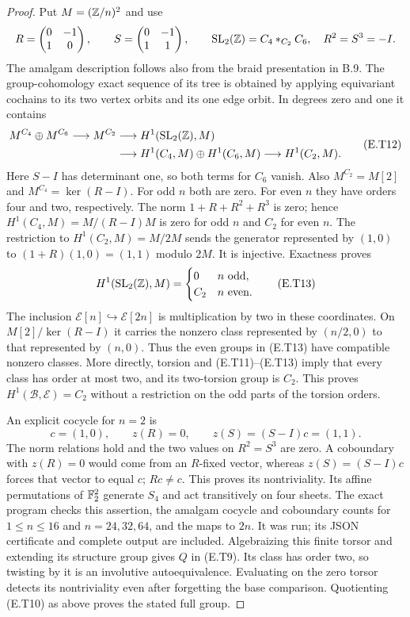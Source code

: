 \begin{proof}
Put $M=(\mathbb Z/n)^2$ and use
\[
 R=\begin{pmatrix}0&-1\\1&0\end{pmatrix},\qquad
 S=\begin{pmatrix}0&-1\\1&1\end{pmatrix},\qquad
 \operatorname{SL}_2(\mathbb Z)=C_4*_{C_2}C_6,
 \quad R^2=S^3=-I.
\]
The amalgam description follows also from the braid
presentation in B.9.  The group-cohomology exact sequence
of its tree is obtained by applying equivariant cochains
to its two vertex orbits and its one edge orbit.  In
degrees zero and one it contains
\[
 \begin{split}
 M^{C_4}\oplus M^{C_6}\longrightarrow M^{C_2}
 &\longrightarrow H^1(\operatorname{SL}_2(\mathbb Z),M)\\
 &\longrightarrow H^1(C_4,M)\oplus H^1(C_6,M)
 \longrightarrow H^1(C_2,M).
 \end{split}
 \tag{E.T12}
\]
Here $S-I$ has determinant one, so both terms for $C_6$
vanish.  Also $M^{C_2}=M[2]$ and
$M^{C_4}=\ker(R-I)$.  For odd $n$ both are zero.
For even $n$ they have orders four and two, respectively.
The norm $1+R+R^2+R^3$ is zero; hence
$H^1(C_4,M)=M/(R-I)M$ is zero for odd $n$ and $C_2$
for even $n$.  The restriction to
$H^1(C_2,M)=M/2M$ sends the generator represented by
$(1,0)$ to $(1+R)(1,0)=(1,1)$ modulo $2M$.
It is injective.  Exactness proves
\[
 H^1(\operatorname{SL}_2(\mathbb Z),M)=
 \begin{cases}0& n\text{ odd},\\ C_2& n\text{ even}.
 \end{cases}
 \tag{E.T13}
\]
The inclusion $\mathcal E[n]\hookrightarrow\mathcal E[2n]$
is multiplication by two in these coordinates.  On
$M[2]/\ker(R-I)$ it carries the nonzero class represented
by $(n/2,0)$ to that represented by $(n,0)$.  Thus the
even groups in (E.T13) have compatible nonzero classes.
More directly, torsion and (E.T11)--(E.T13) imply that
every class has order at most two, and its two-torsion
group is $C_2$.  This proves
$H^1(\mathcal B,\mathcal E)=C_2$ without a restriction
on the odd parts of the torsion orders.

An explicit cocycle for $n=2$ is
\[
 c=(1,0),\qquad z(R)=0,\qquad z(S)=(S-I)c=(1,1).
 \tag{E.T14}
\]
The norm relations hold and the two values on
$R^2=S^3$ are zero.  A coboundary with $z(R)=0$
would come from an $R$-fixed vector, whereas
$z(S)=(S-I)c$ forces that vector to equal $c$;
$Rc\ne c$.  This proves its nontriviality.
Its affine permutations of $\mathbb F_2^2$ generate $S_4$
and act transitively on four sheets.  The exact program
 checks this assertion,
the amalgam cocycle and coboundary counts for
$1\leq n\leq16$ and $n=24,32,64$, and the maps to $2n$.
It was run; its JSON certificate and complete output
are included.  Algebraizing this finite torsor and
extending its structure group gives $Q$ in (E.T9).
Its class has order two, so twisting by it is an
involutive autoequivalence.  Evaluating on the zero
torsor detects its nontriviality even after forgetting
the base comparison.  Quotienting (E.T10) as above
proves the stated full group.
\end{proof}
